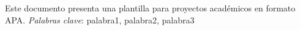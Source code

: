 Este documento presenta una plantilla para proyectos académicos en formato APA.
\textit{Palabras clave}: palabra1, palabra2, palabra3